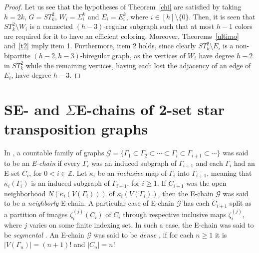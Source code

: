 \documentclass[12pt,reqno]{article}
\begin{document}
\begin{proof} Let us see that the hypotheses of Theorem~\ref{chi} are satisfied by taking $h=2k$, $G=ST^2_k$, $W_i=\Sigma_i^k$ and $E_i=E_i^k$, where $i\in[h]\setminus\{0\}$.
Then, it is seen that $ST^2_k\setminus W_i$ is a connected $(h-3)$-regular subgraph such that at most $h-1$ colors are required for it to have an efficient coloring.
Moreover, Theorems~\ref{ultimo} and~\ref{t2} imply item 1. Furthermore, item 2 holds, since clearly
$ST^2_k\setminus E_i$ is a non-bipartite $(h-2,h-3)$-biregular graph, as the vertices of $W_i$ have degree $h-2$ in $ST^2_k$ while the remaining vertices, having each lost the adjacency of an edge of $E_i$, have degree $h-3$.
\end{proof}

\section{SE- and $\Sigma$E-chains of 2-set star transposition graphs}\label{Cs}
 
In \cite{D73}, a countable family of graphs ${\mathcal G}=\{\Gamma_1\subset\Gamma_2\subset\cdots\subset\Gamma_i\subset\Gamma_{i+1}\subset\cdots\}$ was said to be an {\it E-chain} if every $\Gamma_i$ was an induced subgraph of $\Gamma_{i+1}$ and each $\Gamma_i$  had an E-set $C_i$, for $0<i\in\mathbb{Z}$.
Let $\kappa_i$ be an {\it inclusive} map of $\Gamma_i$ into $\Gamma_{i+1}$, meaning that $\kappa_i(\Gamma_i)$ is an induced subgraph of $\Gamma_{i+1}$, for $i\ge 1$. 
If $C_{i+1}$ was the open neighborhood \cite{D73} $N(\kappa_i(V(\Gamma_i)))$ of $\kappa_i(V(\Gamma_i))$, then the E-chain $\mathcal{G}$ was said to be a {\it neighborly} E-chain.
A particular case of E-chain $\mathcal{G}$ has each $C_{i+1}$ split as a partition of images $\zeta_i^{(j)} (C_i)$ of $C_i$ through respective inclusive maps $\zeta_i^{(j)}$, where $j$ varies on some  finite indexing set. In such a case, the E-chain was said to be {\it segmental} \cite{D73}. 
An E-chain $\mathcal{G}$ was said to be {\it dense} \cite{D73}, if for each $n\ge 1$ it is $|V(\Gamma_n)|=(n+1)!$ and $|C_n|=n!$ 
\end{document}
